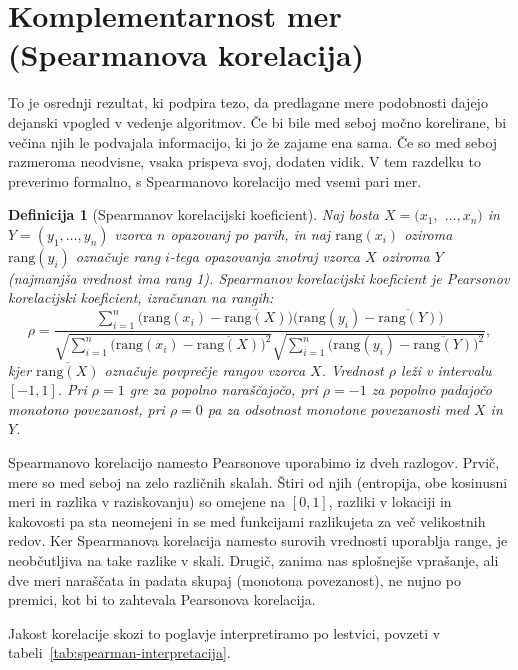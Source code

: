 \documentclass[a4paper, 12pt]{book}
\newtheorem{definicija}[izrek]{Definicija}
\begin{document}
\section{Komplementarnost mer (Spearmanova korelacija)}
\label{sec:spearman}

To je osrednji rezultat, ki podpira tezo, da predlagane mere podobnosti
dajejo dejanski vpogled v vedenje algoritmov. Če bi bile med seboj močno
korelirane, bi večina njih le podvajala informacijo, ki jo že zajame ena
sama. Če so med seboj razmeroma neodvisne, vsaka prispeva svoj, dodaten
vidik. V tem razdelku to preverimo formalno, s Spearmanovo korelacijo med
vsemi pari mer.

\begin{definicija}[Spearmanov korelacijski koeficient]
\label{def:spearman}
Naj bosta $X = (x_1,$ $\dots, x_n)$ in $Y = (y_1, \dots, y_n)$ vzorca $n$
opazovanj po parih, in naj $\mathrm{rang}(x_i)$ oziroma $\mathrm{rang}(y_i)$
označuje rang $i$-tega opazovanja znotraj vzorca $X$ oziroma $Y$ (najmanjša
vrednost ima rang 1). Spearmanov korelacijski koeficient je Pearsonov
korelacijski koeficient, izračunan na rangih:
\[
    \rho = \frac{\sum_{i=1}^n \bigl(\mathrm{rang}(x_i) - \overline{\mathrm{rang}(X)}\bigr)\bigl(\mathrm{rang}(y_i) - \overline{\mathrm{rang}(Y)}\bigr)}
    {\sqrt{\sum_{i=1}^n \bigl(\mathrm{rang}(x_i) - \overline{\mathrm{rang}(X)}\bigr)^2} \sqrt{\sum_{i=1}^n \bigl(\mathrm{rang}(y_i) - \overline{\mathrm{rang}(Y)}\bigr)^2}},
\]
kjer $\overline{\mathrm{rang}(X)}$ označuje povprečje rangov vzorca $X$.
Vrednost $\rho$ leži v intervalu $[-1, 1]$. Pri $\rho = 1$ gre za popolno
naraščajočo, pri $\rho = -1$ za popolno padajočo monotono povezanost, pri
$\rho = 0$ pa za odsotnost monotone povezanosti med $X$ in $Y$.
\end{definicija}

Spearmanovo korelacijo namesto Pearsonove uporabimo iz dveh razlogov.
Prvič, mere so med seboj na zelo različnih skalah. Štiri od njih
(entropija, obe kosinusni meri in razlika v raziskovanju) so omejene na
$[0,1]$, razliki v lokaciji in kakovosti pa sta neomejeni in se med
funkcijami razlikujeta za več velikostnih redov. Ker Spearmanova
korelacija namesto surovih vrednosti uporablja range, je neobčutljiva na
take razlike v skali. Drugič, zanima nas splošnejše vprašanje, ali dve meri
naraščata in padata skupaj (monotona povezanost), ne nujno po premici, kot
bi to zahtevala Pearsonova korelacija.

Jakost korelacije skozi to poglavje interpretiramo po lestvici, povzeti v
tabeli~\ref{tab:spearman-interpretacija}.
\end{document}
